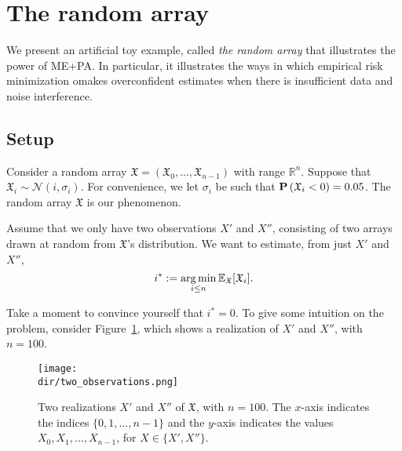 %



%



\section{The random array}
\label{sec:random_array}

We present an artificial toy example, called \emph{the random array} that illustrates the power of ME+PA. In particular, it illustrates the ways in which empirical risk minimization omakes overconfident estimates when there is insufficient data and noise interference.

\subsection{Setup}

Consider a random array $\mathfrak{X} = \left(\mathfrak{X}_0, \ldots, \mathfrak{X}_{n-1}\right)$ with range $\mathbb{R}^n$. Suppose that $\mathfrak{X}_i \sim \mathcal{N}\left(i, \sigma_i\right)$. For convenience, we let $\sigma_i$ be such that $\mathbf{P}\left(\mathfrak{X}_i < 0\right) = 0.05$. The random array $\mathfrak{X}$ is our phenomenon. 

Assume that we only have two observations $X'$ and $X''$, consisting of two arrays drawn at random from $\mathfrak{X}$'s distribution. We want to estimate, from just $X'$ and $X''$,
%
\begin{equation}
i^* := \operatorname*{arg\,min}_{i \leq n} \mathbb{E}_{\mathfrak{X}}[\mathfrak{X}_i].
\end{equation}

Take a moment to convince yourself that $i^* = 0$. To give some intuition on the problem, 
consider Figure~\ref{fig:illustration_random_array}, which shows a realization of $X'$ and $X''$, with $n = 100$. 

\begin{figure}[hbtp]
\centering
\texttt{[image: \\dir/two\_observations.png]}
\caption{Two realizations $X'$ and $X''$ of $\mathfrak{X}$, with $n = 100$. The $x$-axis indicates the indices $\{0, 1, \ldots, n-1\}$ and the $y$-axis indicates the values $X_0, X_1, \ldots, X_{n-1}$, for $X \in \{X', X''\}$.}
\label{fig:illustration_random_array}
\end{figure}


